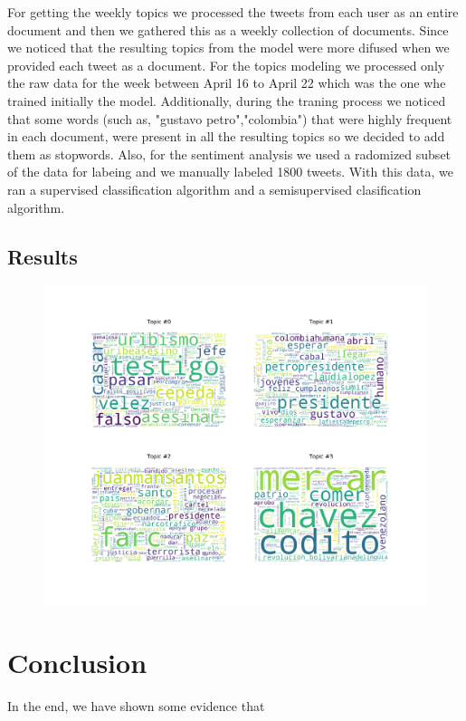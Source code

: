 \documentclass[10pt,a4paper]{article} %
\begin{document}
	For getting the weekly topics we processed the tweets from each user as an entire document and then we gathered this as a weekly collection of documents. Since we noticed that the resulting topics from the model were more difused when we provided each tweet as a document. For the topics modeling we processed only the raw data for the week between April 16 to April 22 which was the one whe trained initially the model. Additionally, during the traning process we noticed that some words (such as, "gustavo petro","colombia") that were highly frequent in each document, were present in all the resulting topics so we decided to add them as stopwords. Also, for the sentiment analysis we used a radomized subset of the data for labeing and we manually labeled 1800 tweets. With this data, we ran a supervised classification algorithm and a semisupervised clasification algorithm.
	
	\subsection{Results}



\begin{figure}[h]
\includegraphics[width=\linewidth]{topics_week_16.svg}
\centering
\end{figure}
	
	\section{Conclusion}
	
	In the end, we have shown some evidence that
	
	\nocite{*}
	
	
\end{document}
